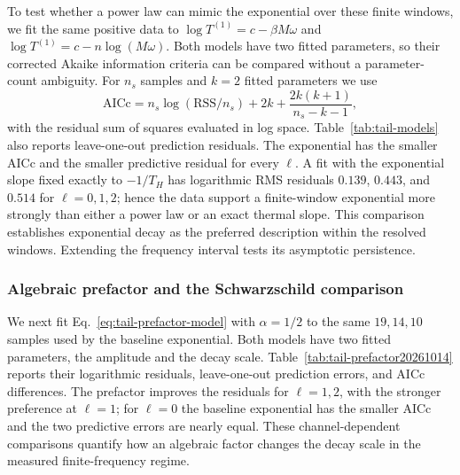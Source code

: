 \documentclass[aps,prd,twocolumn,10pt,nofootinbib,superscriptaddress,floatfix]{revtex4-2}
\begin{document}
To test whether a power law can mimic the exponential over these finite
windows, we fit the same positive data to
$\log T^{(1)}=c-\beta M\omega$ and
$\log T^{(1)}=c-n\log(M\omega)$.  Both models have two fitted parameters, so
their corrected Akaike information criteria can be compared without a
parameter-count ambiguity.  For $n_s$ samples and $k=2$ fitted parameters we
use
\begin{equation}
\mathrm{AICc}=n_s\log(\mathrm{RSS}/n_s)+2k
+\frac{2k(k+1)}{n_s-k-1},
\label{eq:aicc}
\end{equation}
with the residual sum of squares evaluated in log space.
Table~\ref{tab:tail-models} also reports
leave-one-out prediction residuals.  The exponential has the smaller AICc and
the smaller predictive residual for every $\ell$.  A fit with the exponential
slope fixed exactly to $-1/T_H$ has logarithmic RMS residuals $0.139$, $0.443$,
and $0.514$ for $\ell=0,1,2$; hence the data support a finite-window
exponential more strongly than either a power law or an exact thermal slope.
This comparison establishes exponential decay as the preferred description
within the resolved windows.  Extending the frequency interval tests its
asymptotic persistence.

\subsubsection{Algebraic prefactor and the Schwarzschild comparison}

We next fit Eq.~\eqref{eq:tail-prefactor-model} with $\alpha=1/2$ to the
same $19,14,10$ samples used by the baseline exponential.
Both models have two fitted parameters, the amplitude and the decay scale.
Table~\ref{tab:tail-prefactor20261014} reports their logarithmic residuals,
leave-one-out prediction errors, and AICc differences.  The prefactor
improves the residuals for $\ell=1,2$, with the stronger preference at
$\ell=1$; for $\ell=0$ the baseline exponential has the smaller AICc and
the two predictive errors are nearly equal.  These channel-dependent
comparisons quantify how an algebraic factor changes the decay scale
in the measured finite-frequency regime.
\end{document}
